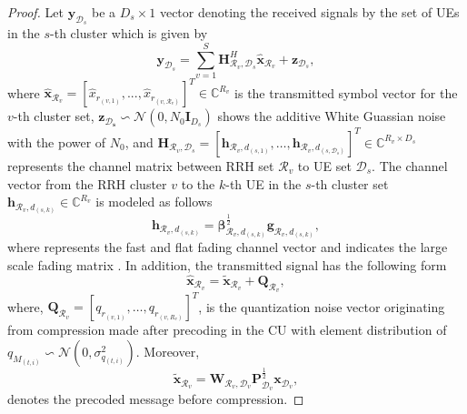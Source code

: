 \documentclass[conference,10pt,twocolumn,letter]{IEEEtran}
\begin{document}
\begin{proof}
Let $\boldsymbol{y}_{\mathcal{D}_s}$ be a $D_s \times 1$ vector denoting the received signals by the set of UEs in the $s$-th cluster which is given by
\begin{equation} \label{1}
\boldsymbol{y}_{\mathcal{D}_s} = \sum_{v=1}^S \boldsymbol{H}^H_{\mathcal{R}_v,\mathcal{D}_s}\hat{\boldsymbol{x}}_{\mathcal{R}_v}+ \boldsymbol{z}_{\mathcal{D}_s},
\end{equation}
where $\hat{\boldsymbol{x}}_{ \mathcal{R}_v} = [\hat{x}_{ r_{(v,1)}},...,\hat{ x}_{ r_{(v,\mathcal{R}_v)}}]^T \in \mathbb{C}^{{R}_v } $ is the transmitted symbol vector for the $v$-th cluster set, $\boldsymbol{z_{\mathcal{D}_s}} \backsim \mathcal{N}(0,N_0\boldsymbol{I}_{{D}_s})$ shows the additive White Guassian noise with the power of $N_0$, and $\boldsymbol{H}_{\mathcal{R}_v,\mathcal{D}_s}=\left[\boldsymbol{h}_{\mathcal{R}_v,d_{(s,1)}},\ldots,\boldsymbol{h}_{\mathcal{R}_v,d_{(s,\mathcal{D}_s)}}\right]^T  \in \mathbb{C}^{{R}_v\times {D}_s}$ 
represents the channel matrix between RRH set $\mathcal{R}_v$ to UE set
$\mathcal{D}_s$. The channel vector from the RRH cluster $v$ to the $k$-th UE in the $s$-th cluster set $\boldsymbol{h}_{\mathcal{R}_v,d_{(s,k)}}\in \mathbb{C}^{{R}_v}$ is modeled as follows
\begin{equation}
\boldsymbol{h}_{\mathcal{R}_v,d_{(s,k)}} = \boldsymbol{\beta}^\frac{1}{2}_{\mathcal{R}_v,d_{(s,k)}} \boldsymbol{g}_{\mathcal{R}_v,d_{(s,k)}},
\end{equation}
where  represents the fast and flat fading channel vector and 
indicates the large scale fading matrix \cite{88}. In addition, the transmitted signal has the following form
\begin{equation}
\label{eq_pow1}
 \hat{\boldsymbol{x}}_{\mathcal{R}_v} = \tilde{\boldsymbol{x}}_{\mathcal{R}_v} + \boldsymbol{Q}_{\mathcal{R}_v},
\end{equation}
where, $\boldsymbol{Q}_{\mathcal{R}_v} = \left[ q_{r_{(v,1)}},\ldots,q_{r_{(v,R_v)}}\right]^T$,  is the quantization noise vector originating from compression made after precoding in the CU with element distribution of
$q_{M_{(t,i)}}\backsim \mathcal{N}(0,\sigma_{q_{(t,i)}}^2) $. Moreover,
$$\tilde{\boldsymbol{x}}_{\mathcal{R}_v} = \textbf{W}_{\mathcal{R}_v,\mathcal{D}_v} \textbf{P}_{\mathcal{D}_v}^{\frac{1}{2}} \boldsymbol{x}_{ \mathcal{D}_v},$$
denotes the precoded message before compression.



\end{proof}
\end{document}
